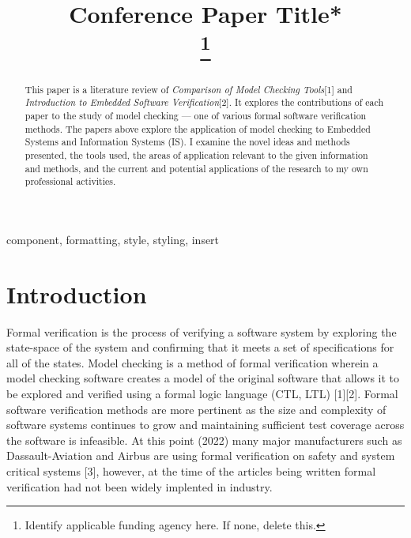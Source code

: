 \documentclass[conference]{IEEEtran}
\begin{document}
\title{Conference Paper Title*\\
\thanks{Identify applicable funding agency here. If none, delete this.}
}

\author{
}

\maketitle

\begin{abstract}
This paper is a literature review of \emph{Comparison of Model Checking Tools}[1] and \emph{Introduction to Embedded Software Verification}[2]. It explores the contributions of each paper to the study of model checking --- one of various formal software verification methods. The papers above explore the application of model checking to Embedded Systems and Information Systems (IS). I examine the novel ideas and methods presented, the tools used, the areas of application relevant to the given information and methods, and the current and potential applications of the research to my own professional activities.
\end{abstract}

\begin{IEEEkeywords}
component, formatting, style, styling, insert
\end{IEEEkeywords}

\section{Introduction}
Formal verification is the process of verifying a software system by exploring the state-space of the system and confirming that it meets a set of specifications for all of the states. Model checking is a method of formal verification wherein a model checking software creates a model of the original software that allows it to be explored and verified using a formal logic language (CTL, LTL) [1][2]. Formal software verification methods are more pertinent as the size and complexity of software systems continues to grow and maintaining sufficient test coverage across the software is infeasible. At this point (2022) many major manufacturers such as Dassault-Aviation and Airbus are using formal verification on safety and system critical systems [3], however, at the time of the articles being written formal verification had not been widely implented in industry.
\end{document}
